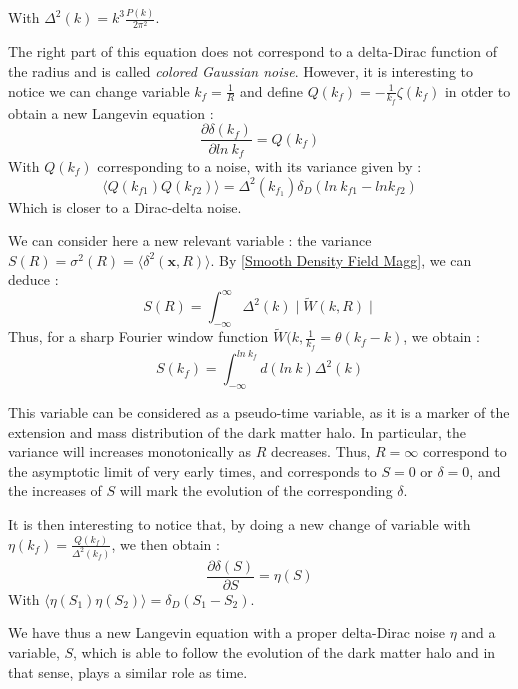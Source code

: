 With $\Delta^2(k) = k^3 \frac{P(k)}{2\pi^2}$.

The right part of this equation does not correspond to a delta-Dirac function of the radius and is called \textit{colored Gaussian noise}. However, it is interesting to notice we can change variable $k_f = \frac{1}{R}$ and define $Q(k_f) = -\frac{1}{k_f} \zeta(k_f)$ in otder to obtain a new Langevin equation :
\begin{equation}
\label{Langevin Second}
\frac{\partial \delta(k_f)}{\partial ln \ k_f} = Q (k_f)
\end{equation}
With $Q(k_f)$ corresponding to a noise, with its variance given by :
\begin{equation}
\langle Q (k_{f1}) Q (k_{f2}) \rangle = \Delta^2(k_{f_1}) \delta_D (ln \ k_{f1} - ln k_{f2})
\end{equation}
Which is closer to a Dirac-delta noise.


We can consider here a new relevant variable : the variance $S(R) = \sigma^2(R) = \langle \delta^2(\textbf{x},R) \rangle$. By \ref{Smooth Density Field Magg}, we can deduce :
\begin{equation}
\label{S var 2}
S(R) = \int^\infty_{-\infty} \Delta^2(k) \mid \widetilde{W}(k,R) \mid
\end{equation}
Thus, for a sharp Fourier window function $\widetilde{W}(k, \frac{1}{k_f} = \theta(k_f - k)$, we obtain :
\begin{equation}
\label{S var}
S(k_f) = \int_{-\infty}^{ln \ k_f} d(ln \ k) \Delta^2(k)
\end{equation}

This variable can be considered as a pseudo-time variable, as it is a marker of the extension and mass distribution of the dark matter halo. In particular, the variance will increases monotonically as $R$ decreases. Thus, $R=\infty$ correspond to the asymptotic limit of very early times, and corresponds to $S=0$ or $\delta = 0$, and the increases of $S$ will mark the evolution of the corresponding $\delta$.

It is then interesting to notice that, by doing a new change of variable with $\eta(k_f) = \frac{Q(k_f)}{\Delta^2(k_f)}$, we then obtain :
\begin{equation}
\label{Langevin Third}
\frac{\partial \delta(S)}{\partial S} = \eta(S)
\end{equation}
With $\langle \eta (S_1) \eta (S_2) \rangle = \delta_D (S_1 - S_2)$.

We have thus a new Langevin equation with a proper delta-Dirac noise $\eta$ and a variable, $S$, which is able to follow the evolution of the dark matter halo and in that sense, plays a similar role as time.

